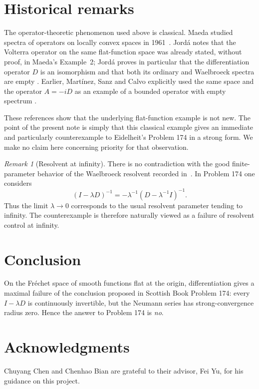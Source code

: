 \documentclass[11pt]{article}
\theoremstyle{remark}
\newtheorem{remark}[theorem]{Remark}
\begin{document}
\section{Historical remarks}

The operator-theoretic phenomenon used above is classical.  Maeda studied spectra of
operators on locally convex spaces in 1961~\cite{Maeda}.  Jord\'a notes that the Volterra
operator on the same flat-function space was already stated, without proof, in Maeda's
Example~2; Jord\'a proves in particular that the differentiation operator $D$ is an
isomorphism and that both its ordinary and Waelbroeck spectra are empty
\cite[Proposition~1]{Jorda}.  Earlier, Mart\'inez, Sanz and Calvo explicitly used the same
space and the operator $A=-iD$ as an example of a bounded operator with empty spectrum
\cite[Example~2]{MSC}.

These references show that the underlying flat-function example is not new.  The point of
the present note is simply that this classical example gives an immediate and particularly
counterexample to Eidelheit's Problem 174 in a strong form.  We make no claim here concerning
priority for that observation.

\begin{remark}[Resolvent at infinity]
There is no contradiction with the good finite-parameter behavior of the Waelbroeck
resolvent recorded in~\cite{Jorda}.  In Problem 174 one considers
\[
  (I-\lambda D)^{-1}
   =-\lambda^{-1}(D-\lambda^{-1}I)^{-1}.
\]
Thus the limit $\lambda\to0$ corresponds to the usual resolvent parameter tending to
infinity.  The counterexample is therefore naturally viewed as a failure of resolvent
control at infinity.
\end{remark}

\section*{Conclusion}

On the Fr\'echet space of smooth functions flat at the origin, differentiation gives a
maximal failure of the conclusion proposed in Scottish Book Problem 174: every
$I-\lambda D$ is continuously invertible, but the Neumann series has strong-convergence
radius zero.  Hence the answer to Problem 174 is \emph{no}.


\section*{Acknowledgments}
Chuyang Chen and Chenhao Bian are grateful to their advisor, Fei Yu, for his guidance on this project.
\end{document}
